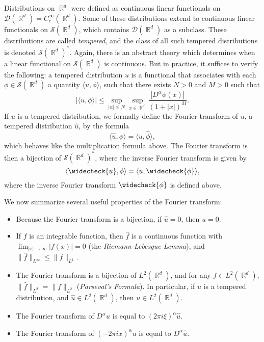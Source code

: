 \documentclass[answers]{exam}
\DeclareMathOperator{\RR}{\mathbb{R}}
\theoremstyle{problemstyle}
\newcommand{\1}[1]{\textbf{1}_{\left[#1\right]}} %
\begin{document}
\begin{questions}
Distributions on $\RR^d$ were defined as continuous linear functionals on $\mathcal{D}(\RR^d) = C_c^\infty(\RR^d)$. Some of these distributions extend to continuous linear functionals on $\mathcal{S}(\RR^d)$, which contains $\mathcal{D}(\RR^d)$ as a subclass. These distributions are called \emph{tempered}, and the class of all such tempered distributions is denoted $\mathcal{S}(\RR^d)^*$. Again, there is an abstract theory which determines when a linear functional on $\mathcal{S}(\RR^d)$ is continuous. But in practice, it suffices to verify the following: a tempered distribution $u$ is a functional that associates with each $\phi \in \mathcal{S}(\RR^d)$ a quantity $\langle u, \phi \rangle$, such that there exists $N > 0$ and $M > 0$ such that
%
\[ |\langle u, \phi \rangle| \leq \sup_{|\alpha| \leq N} \sup_{x \in \RR^d} \frac{|D^\alpha \phi(x)|}{(1 + |x|)^M}. \]
%
If $u$ is a tempered distribution, we formally define the Fourier transform of $u$, a tempered distribution $\widehat{u}$, by the formula
%
\[ \langle \widehat{u}, \phi \rangle = \langle u, \widehat{\phi} \rangle, \]
%
which behaves like the multiplication formula above. The Fourier transform is then a bijection of $\mathcal{S}(\RR^d)^*$, where the inverse Fourier transform is given by
%
\[ \langle \widecheck{u}, \phi \rangle = \langle u, \widecheck{\phi} \rangle, \]
%
where the inverse Fourier transform $\widecheck{\phi}$ is defined above.

We now summarize several useful properties of the Fourier transform:
%
\begin{itemize}
	\item Because the Fourier transform is a bijection, if $\widehat{u} = 0$, then $u = 0$.

	\item If $f$ is an integrable function, then $\widehat{f}$ is a continuous function with $\lim_{|x| \to \infty} |f(x)| = 0$ (the \emph{Riemann-Lebesgue Lemma}), and $\| \widehat{f} \|_{L^\infty} \leq \| f \|_{L^1}$.

	\item The Fourier transform is a bijection of $L^2(\RR^d)$, and for any $f \in L^2(\RR^d)$, $\| \widehat{f} \|_{L^2} = \| f \|_{L^2}$ (\emph{Parseval's Formula}). In particular, if $u$ is a tempered distribution, and $\widehat{u} \in L^2(\RR^d)$, then $u \in L^2(\RR^d)$.

	\item The Fourier transform of $D^\alpha u$ is equal to $(2 \pi i \xi)^\alpha \widehat{u}$.

	\item The Fourier transform of $(- 2 \pi i x)^\alpha u$ is equal to $D^\alpha \widehat{u}$.


\end{itemize}
\end{questions}
\end{document}
